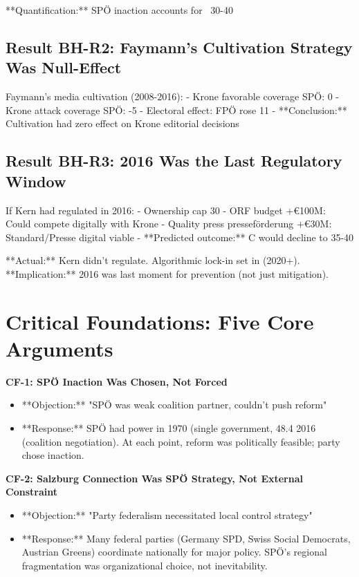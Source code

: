 **Quantification:** SPÖ inaction accounts for ~30-40%

\subsection*{Result BH-R2: Faymann's Cultivation Strategy Was Null-Effect}

Faymann's media cultivation (2008-2016):
- Krone favorable coverage SPÖ: 0%
- Krone attack coverage SPÖ: -5%
- Electoral effect: FPÖ rose 11%
- **Conclusion:** Cultivation had zero effect on Krone editorial decisions

\subsection*{Result BH-R3: 2016 Was the Last Regulatory Window}

If Kern had regulated in 2016:
- Ownership cap 30%
- ORF budget +€100M: Could compete digitally with Krone
- Quality press presseförderung +€30M: Standard/Presse digital viable
- **Predicted outcome:** C would decline to 35-40%

**Actual:** Kern didn't regulate. Algorithmic lock-in set in (2020+).
**Implication:** 2016 was last moment for prevention (not just mitigation).


\section*{Critical Foundations: Five Core Arguments}

\textbf{CF-1: SPÖ Inaction Was Chosen, Not Forced}
\begin{itemize}
\item **Objection:** "SPÖ was weak coalition partner, couldn't push reform"
\item **Response:** SPÖ had power in 1970 (single government, 48.4%
  2016 (coalition negotiation). At each point, reform was politically feasible; party chose inaction.
\end{itemize}

\textbf{CF-2: Salzburg Connection Was SPÖ Strategy, Not External Constraint}
\begin{itemize}
\item **Objection:** "Party federalism necessitated local control strategy"
\item **Response:** Many federal parties (Germany SPD, Swiss Social Democrats, Austrian Greens) coordinate
  nationally for major policy. SPÖ's regional fragmentation was organizational choice, not inevitability.
\end{itemize}

